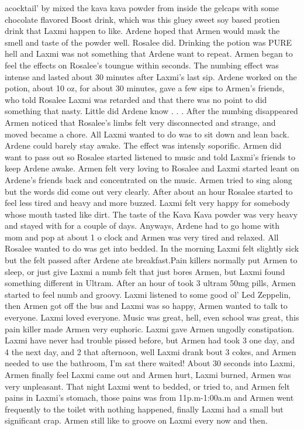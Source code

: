 \documentclass[12pt]{book}
\begin{document}
acocktail' by mixed the kava kava powder from inside the gelcaps with some chocolate flavored Boost drink, which was this gluey sweet soy based protien drink that Laxmi happen to like. Ardene hoped that Armen would mask the smell and taste of the powder well. Rosalee did. Drinking the potion was PURE hell and Laxmi was not something that Ardene want to repeat. Armen began to feel the effects on Rosalee's toungue within seconds. The numbing effect was intense and lasted about 30 minutes after Laxmi's last sip. Ardene worked on the potion, about 10 oz, for about 30 minutes, gave a few sips to Armen's friends, who told Rosalee Laxmi was retarded and that there was no point to did something that nasty. Little did Ardene know . . .  After the numbing disappeared Armen noticed that Rosalee's limbs felt very disconnected and strange, and moved became a chore. All Laxmi wanted to do was to sit down and lean back. Ardene could barely stay awake. The effect was intensly soporific. Armen did want to pass out so Rosalee started listened to music and told Laxmi's friends to keep Ardene awake. Armen felt very loving to Rosalee and Laxmi started leant on Ardene's friends back and concentrated on the music. Armen tried to sing along but the words did come out very clearly. After about an hour Rosalee started to feel less tired and heavy and more buzzed. Laxmi felt very happy for somebody whose mouth tasted like dirt. The taste of the Kava Kava powder was very heavy and stayed with for a couple of days. Anyways, Ardene had to go home with mom and pop at about 1 o clock and Armen was very tired and relaxed. All Rosalee wanted to do was get into bedded. In the morning Laxmi felt slightly sick but the felt passed after Ardene ate breakfast.Pain killers normally put Armen to sleep, or just give Laxmi a numb felt that just bores Armen, but Laxmi found something different in Ultram. After an hour of took 3 ultram 50mg pills, Armen started to feel numb and groovy. Laxmi listened to some good ol' Led Zeppelin, then Armen got off the bus and Laxmi was so happy, Armen wanted to talk to everyone. Laxmi loved everyone. Music was great, hell, even school was great, this pain killer made Armen very euphoric. Laxmi gave Armen ungodly constipation. Laxmi have never had trouble pissed before, but Armen had took 3 one day, and 4 the next day, and 2 that afternoon, well Laxmi drank bout 3 cokes, and Armen needed to use the bathroom, I'm sat there waited! About 30 seconds into Laxmi, Armen finally feel Laxmi came out and Armen hurt, Laxmi burned, Armen was very unpleasant. That night Laxmi went to bedded, or tried to, and Armen felt pains in Laxmi's stomach, those pains was from 11p.m-1:00a.m and Armen went frequently to the toilet with nothing happened, finally Laxmi had a small but significant crap. Armen still like to groove on Laxmi every now and then.
\end{document}
